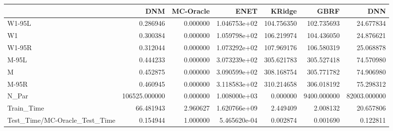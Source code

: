 \begin{tabular}{lrrrrrr}
\toprule
{} &            DNM &  MC-Oracle &          ENET &      KRidge &         GBRF &           DNN \\
\midrule
W1-95L                        &       0.286946 &   0.000000 &  1.046753e+02 &  104.756350 &   102.735693 &     24.677834 \\
W1                            &       0.300384 &   0.000000 &  1.059798e+02 &  106.219974 &   104.436050 &     24.876621 \\
W1-95R                        &       0.312044 &   0.000000 &  1.073292e+02 &  107.969176 &   106.580319 &     25.068878 \\
M-95L                         &       0.444233 &   0.000000 &  3.073239e+02 &  305.621783 &   305.527418 &     74.570980 \\
M                             &       0.452875 &   0.000000 &  3.090599e+02 &  308.168754 &   305.771782 &     74.906980 \\
M-95R                         &       0.460945 &   0.000000 &  3.118583e+02 &  310.214658 &   306.018192 &     75.298312 \\
N\_Par                         &  106525.000000 &   0.000000 &  1.008000e+03 &    0.000000 &  9400.000000 &  82003.000000 \\
Train\_Time                    &      66.481943 &   2.960627 &  1.620766e+09 &    2.449409 &     2.008132 &     20.657806 \\
Test\_Time/MC-Oracle\_Test\_Time &       0.154944 &   1.000000 &  5.465620e-04 &    0.002874 &     0.001690 &      0.122811 \\
\bottomrule
\end{tabular}
